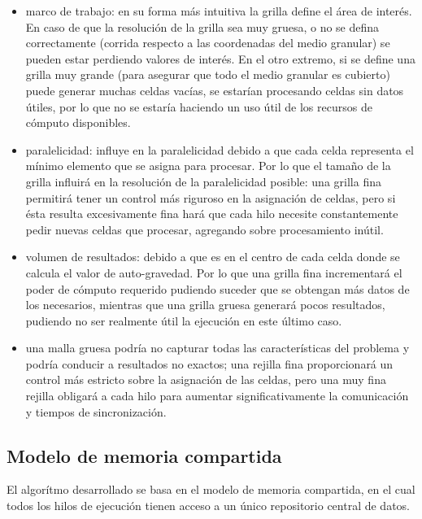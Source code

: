 \documentclass[a4paper,11pt]{book}
\begin{document}
\begin{itemize}
	\item marco de trabajo: en su forma más intuitiva la grilla define el área de interés. En caso de que la resolución de la grilla sea muy gruesa, o no se defina correctamente (corrida respecto a las coordenadas del medio granular) se pueden estar perdiendo valores de interés. En el otro extremo, si se define una grilla muy grande (para asegurar que todo el medio granular es cubierto) puede generar muchas celdas vacías, se estarían procesando celdas sin datos útiles, por lo que no se estaría haciendo un uso útil de los recursos de cómputo disponibles.
	\item paralelicidad: influye en la paralelicidad debido a que cada celda representa el mínimo elemento que se asigna para procesar. Por lo que el tamaño de la grilla influirá en la resolución de la paralelicidad posible: una grilla fina permitirá tener un control más riguroso en la asignación de celdas, pero si ésta resulta excesivamente fina hará que cada hilo necesite constantemente pedir nuevas celdas que procesar, agregando sobre procesamiento inútil.
	\item volumen de resultados: debido a que es en el centro de cada celda donde se calcula el valor de auto-gravedad. Por lo que una grilla fina incrementará el poder de cómputo requerido pudiendo suceder que se obtengan más datos de los necesarios, mientras que una grilla gruesa generará pocos resultados, pudiendo no ser realmente útil la ejecución en este último caso.
	\item una malla gruesa podría no capturar todas las características del problema y podría conducir a resultados no exactos; una rejilla fina proporcionará un control más estricto sobre la asignación de las celdas, pero una muy fina rejilla obligará a cada hilo para aumentar significativamente la comunicación y tiempos de sincronización.
\end{itemize}

\subsection{Modelo de memoria compartida}
El algorítmo desarrollado se basa en el modelo de memoria compartida, en el cual todos los hilos de ejecución tienen acceso a un único repositorio central de datos.
\end{document}
